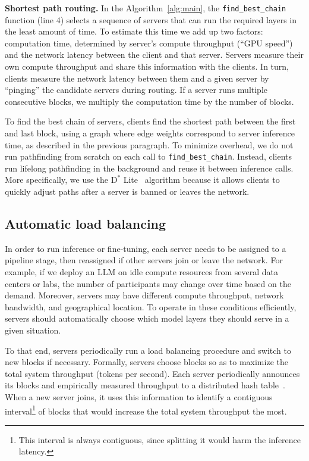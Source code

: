 \textbf{Shortest path routing.}
In the Algorithm~\ref{alg:main}, the \texttt{find\_best\_chain} function (line 4) selects a sequence of servers that can run the required layers in the least amount of time. To estimate this time we add up two factors: computation time, determined by server's compute throughput (``GPU speed'') and the network latency between the client and that server. Servers measure their own compute throughput and share this information with the clients. In turn, clients measure the network latency between them and a given server by ``pinging'' the candidate servers during routing. If a server runs multiple consecutive blocks, we multiply the computation time by the number of blocks. %


To find the best chain of servers, clients find the shortest path between the first and last block, using a graph where edge weights correspond to server inference time, as described in the previous paragraph. To minimize overhead, we do not run pathfinding from scratch on each call to \texttt{find\_best\_chain}. Instead, clients run lifelong pathfinding in the background and reuse it between inference calls. More specifically, we use the $\text{D}^*$ Lite~\citep{dstar} algorithm because it allows clients to quickly adjust paths after a server is banned or leaves the network.




\subsection{Automatic load balancing}\label{sect:method_petals}

In order to run inference or fine-tuning, each server needs to be assigned to a pipeline stage, then reassigned if other servers join or leave the network. For example, if we deploy an LLM on idle compute resources from several data centers or labs, the number of participants may change over time based on the demand. Moreover, servers may have different compute throughput, network bandwidth, and geographical location. To operate in these conditions efficiently, servers should automatically choose which model layers they should serve in a given situation.

To that end, servers periodically run a load balancing procedure and switch to new blocks if necessary. 
Formally, servers choose blocks so as to maximize the total system throughput (tokens per second).
Each server periodically announces its blocks and empirically measured throughput to a distributed hash table~\citep{kademlia}. When a new server joins, it uses this information to identify a contiguous interval\footnote{This interval is always contiguous, since splitting it would harm the inference latency. } of blocks that would increase the total system throughput the most.


